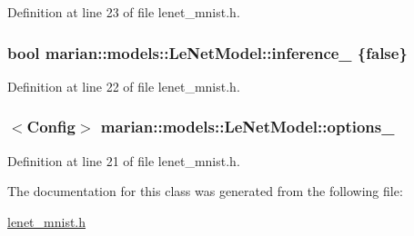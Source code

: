 Definition at line 23 of file lenet\+\_\+mnist.\+h.

\subsubsection[{\texorpdfstring{inference\+\_\+}{inference_}}]{\setlength{\rightskip}{0pt plus 5cm}bool marian\+::models\+::\+Le\+Net\+Model\+::inference\+\_\+ \{false\}\hspace{0.3cm}{\ttfamily [private]}}\hypertarget{classmarian_1_1models_1_1LeNetModel_a0bd282c49c8ed3968e70f62ad2f9ea8a}{}\label{classmarian_1_1models_1_1LeNetModel_a0bd282c49c8ed3968e70f62ad2f9ea8a}


Definition at line 22 of file lenet\+\_\+mnist.\+h.

\subsubsection[{\texorpdfstring{options\+\_\+}{options_}}]{$<${\bf Config}$>$ marian\+::models\+::\+Le\+Net\+Model\+::options\+\_\+\hspace{0.3cm}{\ttfamily [private]}}\hypertarget{classmarian_1_1models_1_1LeNetModel_aac415b744f64e6d89235f85e9004b2b8}{}\label{classmarian_1_1models_1_1LeNetModel_aac415b744f64e6d89235f85e9004b2b8}


Definition at line 21 of file lenet\+\_\+mnist.\+h.



The documentation for this class was generated from the following file\+:\begin{DoxyCompactItemize}
\item 
\hyperlink{lenet__mnist_8h}{lenet\+\_\+mnist.\+h}\end{DoxyCompactItemize}
